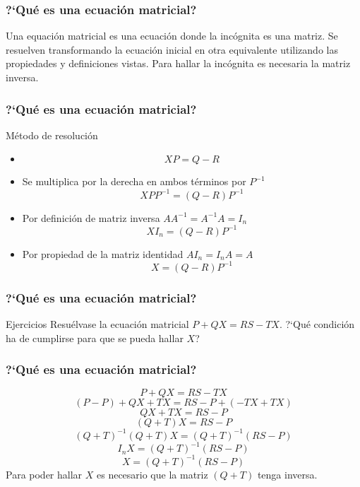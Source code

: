 \documentclass[aspectratio=169]{beamer}
\begin{document}
       \begin{frame}
  \frametitle{?`Qu\'e es una ecuaci\'on matricial?}
Una equaci\'on matricial es una ecuaci\'on donde la inc\'ognita es una matriz. Se resuelven transformando la ecuaci\'on inicial en otra equivalente utilizando las propiedades y definiciones vistas. Para hallar la inc\'ognita es necesaria la matriz inversa. 
  \end{frame} 
  
       \begin{frame}
    \frametitle{?`Qu\'e es una ecuaci\'on matricial?}
       \begin{block}{M\'etodo de resoluci\'on}
\begin{itemize}
\item[]        \[XP = Q-R\]
\item  Se multiplica por la derecha en ambos t\'erminos por $P^{-1}$
\[XPP^{-1} = (Q-R)P^{-1}\]
\item Por definici\'on de matriz inversa $AA^{-1} = A^{-1}A = I_n$
 \[XI_n = (Q-R)P^{-1}\]
\item Por propiedad de la matriz identidad $AI_n = I_nA = A$
\[X=(Q-R)P^{-1}\]  
\end{itemize}
\end{block}
  \end{frame} 
  
  
  
         \begin{frame}
    \frametitle{?`Qu\'e es una ecuaci\'on matricial?}
       \begin{block}{Ejercicios}
Resu\'elvase la ecuaci\'on matricial $P+QX=RS-TX$. ?`Qu\'e condici\'on ha de cumplirse para que se pueda hallar $X$?
\end{block}
  \end{frame} 



  
         \begin{frame}
    \frametitle{?`Qu\'e es una ecuaci\'on matricial?}
\[ P+QX=RS-TX \]\[ (P-P)+QX+TX=RS-P+(-TX+TX)\]
\[ QX+TX=RS-P \]\[ (Q+T)X=RS-P\]
\[  (Q+T)^{-1}(Q+T)X=(Q+T)^{-1}(RS-P)\]\[  I_nX=(Q+T)^{-1}(RS-P) \]
\[  X=(Q+T)^{-1}(RS-P) \]
Para poder hallar $X$ es necesario que la matriz $(Q+T)$ tenga inversa. 
  \end{frame} 
\end{document}
